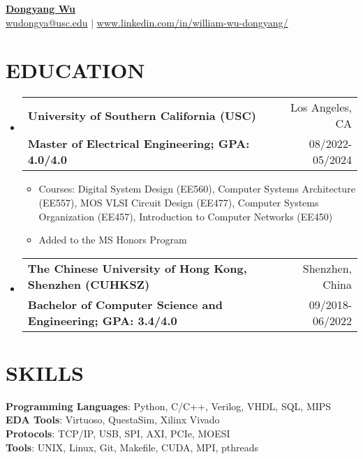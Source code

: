 \documentclass[letterpaper,11pt]{article}
\makeatletter
\newcommand{\resumeItemOne}[1]{
  \item\small{#1}
}
\newcommand{\resumeSubheading}[4]{
  \vspace{-1pt}\item
    \begin{tabular*}{0.97\textwidth}[t]{l@{\extracolsep{\fill}}r}
      \textbf{#1} & #2 \\
      \textbf{\small#3} & \small{#4} \\
    \end{tabular*}\vspace{-10pt}
}
\newcommand{\resumeSubHeadingListStart}{\begin{itemize}[leftmargin=*]}
\newcommand{\resumeSubHeadingListEnd}{\end{itemize}\vspace{-5pt}}
\newcommand{\resumeItemListStart}{\begin{itemize}}
\newcommand{\resumeItemListEnd}{\end{itemize}\vspace{-10pt}}
\makeatother
\begin{document}
\textbf{\href{https://www.linkedin.com/in/william-wu-dongyang/}{\LARGE {Dongyang Wu}}} \\
{
    \href{mailto:{wudongya@usc.edu}}{{wudongya@usc.edu}} $|$ \href{https://www.linkedin.com/in/william-wu-dongyang/}{www.linkedin.com/in/william-wu-dongyang/}
}\section{EDUCATION}
\resumeSubHeadingListStart
\resumeSubheading
    {University of Southern California (USC)}{Los Angeles, CA}
    {Master of Electrical Engineering; GPA: 4.0/4.0
}{08/2022-05/2024}
\resumeItemListStart
	\resumeItemOne{Courses: Digital System Design (EE560), Computer Systems Architecture (EE557), MOS VLSI Circuit Design (EE477), Computer Systems Organization (EE457), Introduction to Computer Networks (EE450)}
	\resumeItemOne{Added to the MS Honors Program}
\resumeItemListEnd
\resumeSubheading
    {The Chinese University of Hong Kong, Shenzhen (CUHKSZ)}{Shenzhen, China}
    {Bachelor of Computer Science and Engineering; GPA: 3.4/4.0
}{09/2018-06/2022}
\resumeSubHeadingListEnd



\section{SKILLS}
\textbf{Programming Languages}: Python, C/C++, Verilog, VHDL, SQL, MIPS\\ 
\textbf{EDA Tools}: Virtuoso, QuestaSim, Xilinx Vivado\\ 
\textbf{Protocols}: TCP/IP, USB, SPI, AXI, PCIe, MOESI\\ 
\textbf{Tools}: UNIX, Linux, Git, Makefile, CUDA, MPI, pthreads\\ 
\end{document}
